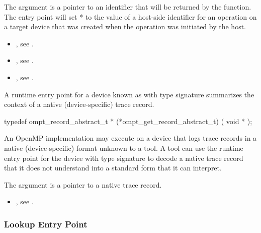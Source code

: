 The argument  is a pointer to an identifier
that will be returned by the function. The entry point will set
* to the value of a host-side identifier for an operation on
a target device that was created when the operation was initiated by
the host.


\crossreferences
\begin{itemize}
\item {},
see .
\item {},
see .
\item {},
see .
\end{itemize}

\label{sec:ompt_get_record_abstract_t}

\summary
A runtime entry point for a device known as
with type signature
summarizes the context of a native (device-specific) trace record.

\format
\begin{ccppspecific}
\begin{omptOther}
typedef ompt_record_abstract_t *
(*ompt_get_record_abstract_t) (
  void *
);
\end{omptOther}
\end{ccppspecific}

\descr
An OpenMP implementation may execute on a device that logs
trace records in a native (device-specific) format unknown to a tool.
A tool can use the 
runtime entry point for the device with type signature
to decode a native trace record that it
does not understand into a standard form that it can interpret.

\argdesc

The argument  is a pointer to a native trace
record.

\crossreferences
\begin{itemize}
\item {},
see .
\end{itemize}

\subsubsection{Lookup Entry Point}

